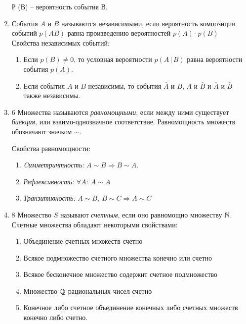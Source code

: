 \documentclass[a4paper,12pt]{article}
\begin{document}
\begin{enumerate}
    Р (В) – вероятность события В. 
    
        \item
        События $A$ и $B$ называются независимыми, если вероятность композиции событий $p(AB)$ равна произведению вероятностей 		$p(A)\cdot p(B)$
        \medskip\\
        Свойства независимых событий: \begin{enumerate}
            \item Если $p(B)\ne0$, то условная вероятности $p(A\,|\,B)$ равна вероятности события $p(A)$.
            \item Если события $A$ и $B$ независимы, то события $\overline{A}$ и $B$, $A$ и $\overline{B}$ и $\overline{A}$ и 	$\overline{B}$ также независимы.
        \end{enumerate}
		\item 6
		Множества называются \textit{равномощными}, если между ними существует \textit{биекция}, или взаимо-однозначное 	соответствие. Равномощность множеств обозначают значком $\sim$.
		
		Свойства равномощности:
		\begin{enumerate}
			\item \textit{Cимметричтность:} $A \sim B \Rightarrow B \sim A$.
			\item \textit{Рефлексивность:} $\forall A: \ A \sim A$
			\item \textit{Транзитивность:} $A \sim B, \ B \sim C  \Rightarrow A \sim C$
		\end{enumerate}
	
		\item 8
		Множество $S$ называют \textit{счетным}, если оно равномощно множеству $\mathbb{N}$.	Счетные множества обладают некоторыми свойствами:
		\begin{enumerate}
			\item Объединение счетных множеств счетно
			\item Всякое подмножество счетного множества конечно или счетно
			\item Всякое бесконечное множество содержит счетное подмножество
			\item Множество $\mathbb{Q}$ рациональных чисел счетно
			\item 
			Конечное либо счетное объединение конечных либо счетных множеств конечно либо счетно.
			

\end{enumerate}
\end{enumerate}
\end{document}
